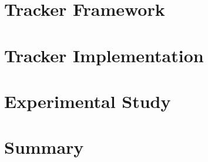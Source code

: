 

\section{Tracker Framework}
\label{fs-acker-tracker}


\section{Tracker Implementation}
\label {fs-acker-impl}


\section{Experimental Study}
\label{fs-experiments}


\section{Summary}
\label {fs-tracker-conclusion}
